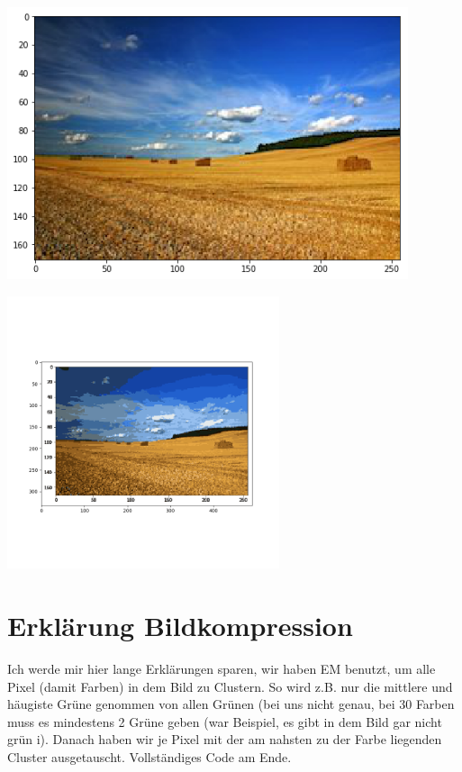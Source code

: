 \includegraphics[height=8cm]{./Dataset/image.png}

\includegraphics[height=8cm]{./plots/compressed.png}

\section*{Erklärung Bildkompression}

Ich werde mir hier lange Erklärungen sparen, wir haben EM benutzt, um alle Pixel (damit Farben) in dem Bild zu Clustern.
So wird z.B. nur die mittlere und häugiste Grüne genommen von allen Grünen (bei uns nicht genau, bei 30 Farben muss es
mindestens 2 Grüne geben (war Beispiel, es gibt in dem Bild gar nicht grün ^^)). Danach haben wir je Pixel mit
der am nahsten zu der Farbe liegenden Cluster ausgetauscht. Vollständiges Code am Ende.



